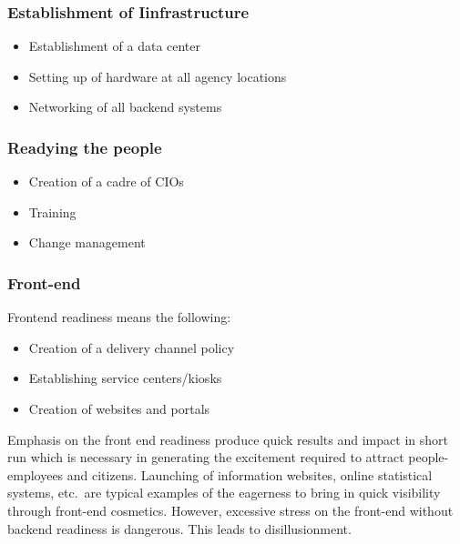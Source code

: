 \subsubsection*{Establishment of Iinfrastructure}
\begin{itemize}
	\item Establishment of a data center
	\item Setting up of hardware at all agency locations
	\item Networking of all backend systems
\end{itemize}

\subsubsection*{Readying the people}
\begin{itemize}
	\item Creation of a cadre of CIOs
	\item Training
	\item Change management
\end{itemize}

\subsubsection*{Front-end} 
Frontend readiness means the following:
\begin{itemize}
	\item Creation of a delivery channel policy
	\item Establishing service centers/kiosks
	\item Creation of websites and portals
\end{itemize}

Emphasis on the front end readiness produce quick results and impact in short run which is necessary in generating the excitement required to attract people- employees and citizens. Launching of information websites, online statistical systems, etc.\ are typical examples of the eagerness to bring in quick visibility through front-end cosmetics. However, excessive stress on the front-end without backend readiness is dangerous. This leads to disillusionment.


\newpage\thispagestyle{empty}
